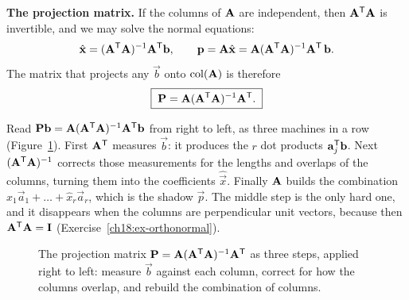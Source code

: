 \begin{formalbox}
\textbf{The projection matrix.} If the columns of $\mathbf{A}$ are independent, then $\mathbf{A}^{\mathsf{T}}\mathbf{A}$
is invertible, and we may solve the normal equations:
\[
  \hat{\mathbf{x}} = (\mathbf{A}^{\mathsf{T}}\mathbf{A})^{-1}\mathbf{A}^{\mathsf{T}}\mathbf{b},
  \qquad
  \mathbf{p} = \mathbf{A}\hat{\mathbf{x}} = \mathbf{A}(\mathbf{A}^{\mathsf{T}}\mathbf{A})^{-1}\mathbf{A}^{\mathsf{T}}\,\mathbf{b}.
\]
The matrix that projects any $\vec{b}$ onto $\operatorname{col}(\mathbf{A})$ is therefore
\[
  \boxed{\;\mathbf{P} = \mathbf{A}(\mathbf{A}^{\mathsf{T}}\mathbf{A})^{-1}\mathbf{A}^{\mathsf{T}}.\;}
\]
\end{formalbox}

Read $\mathbf{P}\mathbf{b}=\mathbf{A}(\mathbf{A}^{\mathsf{T}}\mathbf{A})^{-1}\mathbf{A}^{\mathsf{T}}\mathbf{b}$ from right to left, as three
machines in a row (Figure~\ref{ch18:P-pipeline}). First $\mathbf{A}^{\mathsf{T}}$ measures $\vec{b}$: it
produces the $r$ dot products $\mathbf{a}_j^{\mathsf{T}}\mathbf{b}$. Next $(\mathbf{A}^{\mathsf{T}}\mathbf{A})^{-1}$ corrects those
measurements for the lengths and overlaps of the columns, turning them into the coefficients
$\hat{\vec{x}}$. Finally $\mathbf{A}$ builds the combination $\hat{x}_1\vec{a}_1+\dots+\hat{x}_r\vec{a}_r$,
which is the shadow $\vec{p}$. The middle step is the only hard one, and it disappears when the
columns are perpendicular unit vectors, because then $\mathbf{A}^{\mathsf{T}}\mathbf{A}=\mathbf{I}$
(Exercise~\ref{ch18:ex-orthonormal}).

\begin{figure}[htbp]
\centering
{}
\caption{The projection matrix $\mathbf{P}=\mathbf{A}(\mathbf{A}^{\mathsf{T}}\mathbf{A})^{-1}\mathbf{A}^{\mathsf{T}}$ as three steps,
applied right to left: measure $\vec{b}$ against each column, correct for how the columns overlap,
and rebuild the combination of columns.}
\label{ch18:P-pipeline}
\end{figure}

